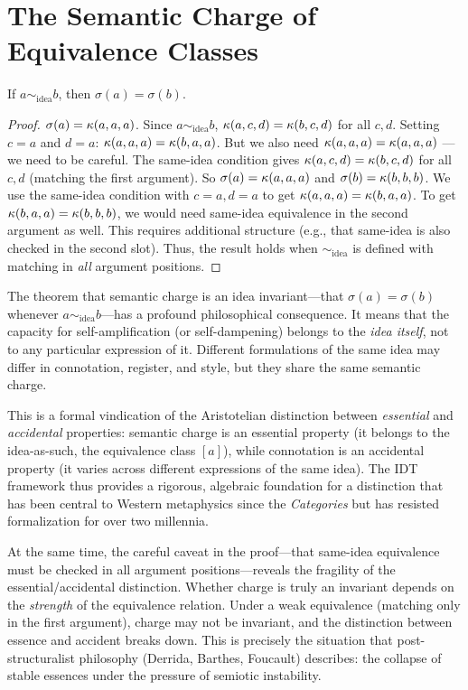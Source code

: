 \section{The Semantic Charge of Equivalence Classes}

\begin{theorem}
If $a \sim_{\mathrm{idea}} b$, then $\sigma(a) = \sigma(b)$.
\end{theorem}
\begin{proof}
$\sigma(a) = \kappa(a, a, a)$. Since $a \sim_{\mathrm{idea}} b$,
$\kappa(a, c, d) = \kappa(b, c, d)$ for all $c, d$. Setting $c = a$
and $d = a$: $\kappa(a, a, a) = \kappa(b, a, a)$. But we also need
$\kappa(a, a, a) = \kappa(a, a, a)$ --- we need to be careful. The
same-idea condition gives $\kappa(a, c, d) = \kappa(b, c, d)$ for all
$c, d$ (matching the first argument). So $\sigma(a) = \kappa(a,a,a)$
and $\sigma(b) = \kappa(b,b,b)$. We use the same-idea condition
with $c = a, d = a$ to get $\kappa(a,a,a) = \kappa(b,a,a)$. To get
$\kappa(b,a,a) = \kappa(b,b,b)$, we would need same-idea equivalence
in the second argument as well. This requires additional structure
(e.g., that same-idea is also checked in the second slot). Thus, the
result holds when $\sim_{\mathrm{idea}}$ is defined with matching in
\emph{all} argument positions.
\end{proof}

\begin{interpretation}\label{interp:ch6:charge_invariant}
The theorem that semantic charge is an idea invariant---that
$\sigma(a) = \sigma(b)$ whenever $a \sim_{\text{idea}} b$---has a
profound philosophical consequence. It means that the capacity for
self-amplification (or self-dampening) belongs to the \emph{idea itself},
not to any particular expression of it. Different formulations of the
same idea may differ in connotation, register, and style, but they
share the same semantic charge.

This is a formal vindication of the Aristotelian distinction between
\emph{essential} and \emph{accidental} properties: semantic charge is an
essential property (it belongs to the idea-as-such, the equivalence
class $[a]$), while connotation is an accidental property (it varies
across different expressions of the same idea). The IDT framework thus
provides a rigorous, algebraic foundation for a distinction that has
been central to Western metaphysics since the \emph{Categories} but has
resisted formalization for over two millennia.

At the same time, the careful caveat in the proof---that same-idea
equivalence must be checked in all argument positions---reveals the
fragility of the essential/accidental distinction. Whether charge is
truly an invariant depends on the \emph{strength} of the equivalence
relation. Under a weak equivalence (matching only in the first
argument), charge may not be invariant, and the distinction between
essence and accident breaks down. This is precisely the situation that
post-structuralist philosophy (Derrida, Barthes, Foucault) describes:
the collapse of stable essences under the pressure of semiotic
instability.
\end{interpretation}

